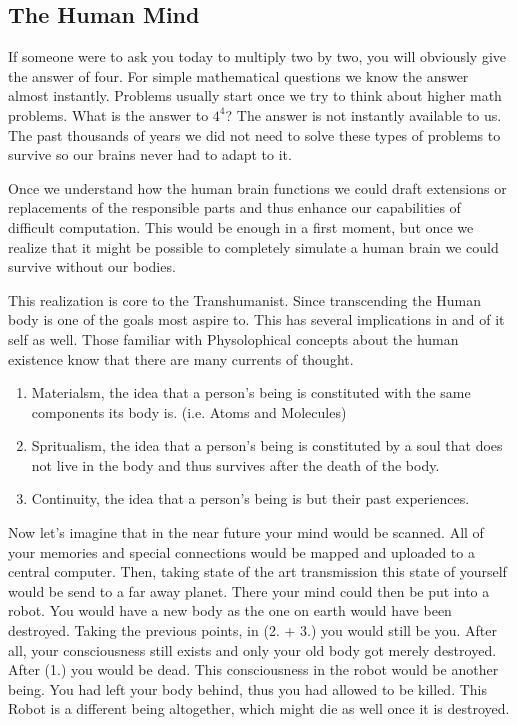 \documentclass[
			12pt,
			a4paper,
			cleardoublepage=empty,
			final,
			twoside
				]{scrbook}
\begin{document}
    \subsection{The Human Mind}
      \begin{par}
	      If someone were to ask you today to multiply two by two, you will obviously give the answer of four. 
        For simple mathematical questions we know the answer almost instantly. Problems usually start once we try to think about higher math problems. 
        What is the answer to $4^4$? The answer is not instantly available to us. 
        The past thousands of years we did not need to solve these types of problems to survive so our brains never had to adapt to it.
      \end{par}
      \begin{par}
	      Once we understand how the human brain functions we could draft extensions or replacements of the responsible parts and thus enhance our capabilities of difficult computation. 
        This would be enough in a first moment, but once we realize that it might be possible to completely simulate a human brain we could survive without our bodies.\cite{FutureMinds}
      \end{par}
      \begin{par}
        This realization is core to the Transhumanist. 
        Since transcending the Human body is one of the goals most aspire to. 
        This has several implications in and of it self as well. 
        Those familiar with Physolophical concepts about the human existence know that there are many currents of thought. 
      \end{par}
      \begin{enumerate}
	      \item Materialsm, the idea that a person's being is constituted with the same components its body is. (i.e. Atoms and Molecules)
	      \item Spritualism, the idea that a person's being is constituted by a soul that does not live in the body and thus survives after the death of the body.
	      \item Continuity, the idea that a person's being is but their past experiences. 
      \end{enumerate}
      \begin{par}
	      Now let's imagine that in the near future your mind would be scanned. All of your memories and special connections would be mapped and uploaded to a central computer. Then, taking state of the art transmission this state of yourself would be send to a far away planet. There your mind could then be put into a robot. You would have a new body as the one on earth would have been destroyed. Taking the previous points, in (2. + 3.) you would still be you. After all, your consciousness still exists and only your old body got merely destroyed. After (1.) you would be dead. This consciousness in the robot would be another being. You had left your body behind, thus you had allowed to be killed. This Robot is a different being altogether, which might die as well once it is destroyed.
      \end{par}
\end{document}
